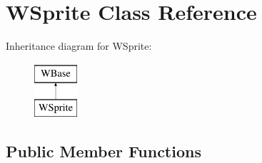 \hypertarget{class_w_sprite}{}\section{W\+Sprite Class Reference}
\label{class_w_sprite}
Inheritance diagram for W\+Sprite\+:\begin{figure}[H]
\begin{center}
\leavevmode
\includegraphics[height=2.000000cm]{class_w_sprite}
\end{center}
\end{figure}
\subsection*{Public Member Functions}
